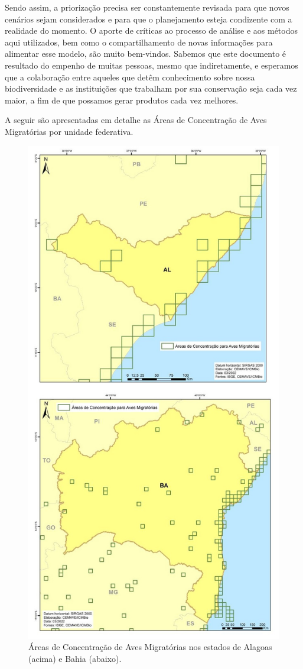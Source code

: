 \documentclass[
  oneside]{scrbook}
\begin{document}
Sendo assim, a priorização precisa ser constantemente revisada para que novos cenários sejam considerados e para que o planejamento esteja condizente com a realidade do momento. O aporte de críticas ao processo de análise e aos métodos aqui utilizados, bem como o compartilhamento de novas informações para alimentar esse modelo, são muito bem-vindos. Sabemos que este documento é resultado do empenho de muitas pessoas, mesmo que indiretamente, e esperamos que a colaboração entre aqueles que detêm conhecimento sobre nossa biodiversidade e as instituições que trabalham por sua conservação seja cada vez maior, a fim de que possamos gerar produtos cada vez melhores.

A seguir são apresentadas em detalhe as Áreas de Concentração de Aves Migratórias por unidade federativa.

\begin{figure}[H]

{\centering \includegraphics[width=0.7\linewidth]{imagens/cap07/Fig_11_AL_BA} 

}

\caption{Áreas de Concentração de Aves Migratórias nos estados de Alagoas (acima) e Bahia (abaixo).}\label{fig:31}
\end{figure}
\end{document}
